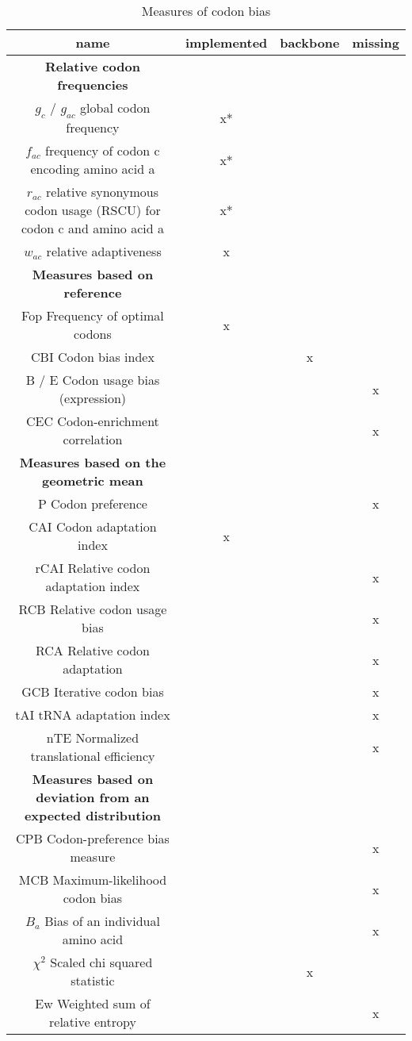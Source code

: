 \begin{table}[tb]
\begin{footnotesize}
\caption[Codon Bias Indices]{Measures of codon bias}
\label{tab:CodonBiasIndices}
\centering
\begin{tabular}{cccc}
\toprule
	name 	& implemented & backbone & missing	  \\ 
\midrule
\textbf{Relative codon frequencies} \\
	$g_c$ / $g_{ac}$ global codon frequency	& x* & & 	 \\
	$f_{ac}$	 frequency of codon c encoding amino acid a & x* & &	 \\
	$r_{ac}$ relative synonymous codon usage (RSCU) for codon c and amino acid a	& x* & &	 \\
	$w_{ac}$	 relative adaptiveness & x & & 	 \\
\midrule
\textbf{Measures based on reference} \\
	Fop	Frequency of optimal codons & x	 & & \\
	CBI	Codon bias index 	& & x &	 \\
	B / E	Codon usage bias (expression) 	& & & x  \\
	CEC	Codon-enrichment correlation 	& & & x	 \\
\midrule	
\textbf{Measures based on the geometric mean} \\
	P	Codon preference 	& & & x	 \\
	CAI	Codon adaptation index	& x & &	 \\
	rCAI	 Relative codon adaptation index	& & & x	 \\
	RCB	Relative codon usage bias	& & & x	 \\
	RCA Relative codon adaptation	& & & x	 \\
	GCB	Iterative codon bias	& & & x	 \\
	tAI	tRNA adaptation index	& & & x	 \\
	nTE	Normalized translational efficiency	& & & x	 \\
\midrule	
\textbf{Measures based on deviation from an expected distribution} \\
	CPB	Codon-preference bias measure	& & & x	 \\
	MCB	Maximum-likelihood codon bias	& & & x	 \\
	$B_a$ Bias of an individual amino acid	& & & x	 \\
	$\chi^2$ Scaled chi squared statistic		& & x &	 \\
	Ew	Weighted sum of relative entropy	& & & x	 \\

\end{tabular}
\end{footnotesize}
\end{table}
